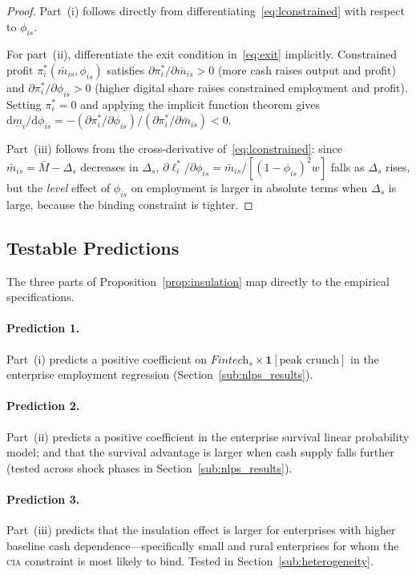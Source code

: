 \begin{proof}
Part~(i) follows directly from differentiating~\eqref{eq:lconstrained} with
respect to $\phi_{is}$.

For part~(ii), differentiate the exit condition in~\eqref{eq:exit} implicitly.
Constrained profit $\pi_i^{*}(\bar{m}_{is}, \phi_{is})$ satisfies
$\partial\pi_i^{*}/\partial\bar{m}_{is} > 0$ (more cash raises output and
profit) and $\partial\pi_i^{*}/\partial\phi_{is} > 0$ (higher digital share
raises constrained employment and profit). Setting $\pi_i^{*} = 0$ and
applying the implicit function theorem gives
$\mathrm{d}\underline{m}_i/\mathrm{d}\phi_{is}
= -(\partial\pi_i^{*}/\partial\phi_{is})/(\partial\pi_i^{*}/\partial\bar{m}_{is}) < 0$.

Part~(iii) follows from the cross-derivative of~\eqref{eq:lconstrained}:
since $\bar{m}_{is} = \bar{M} - \Delta_s$ decreases in $\Delta_s$,
$\partial\ell_i^{*}/\partial\phi_{is} = \bar{m}_{is}/[(1-\phi_{is})^2 w]$
falls as $\Delta_s$ rises, but the \emph{level} effect of $\phi_{is}$ on
employment is larger in absolute terms when $\Delta_s$ is large, because the
binding constraint is tighter.
\end{proof}

\subsection{Testable Predictions}

The three parts of Proposition~\ref{prop:insulation} map directly to the
empirical specifications.

\paragraph{Prediction 1.} Part~(i) predicts a positive coefficient on
$\textit{Fintech}_s \times \mathbf{1}[\text{peak crunch}]$ in the enterprise
employment regression (Section~\ref{sub:nlps_results}).

\paragraph{Prediction 2.} Part~(ii) predicts a positive coefficient in the
enterprise survival linear probability model; and that the survival advantage
is larger when cash supply falls further (tested across shock phases in
Section~\ref{sub:nlps_results}).

\paragraph{Prediction 3.} Part~(iii) predicts that the insulation effect is
larger for enterprises with higher baseline cash dependence---specifically
small and rural enterprises for whom the \textsc{cia} constraint is most
likely to bind. Tested in Section~\ref{sub:heterogeneity}.

